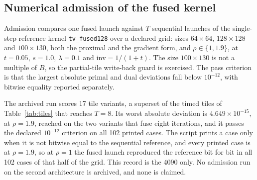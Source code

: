 \subsection{Numerical admission of the fused kernel}

Admission compares one fused launch against $T$ sequential launches of the
single-step reference kernel \texttt{tv\_fused128} over a declared grid: sizes
$64\times64$, $128\times128$ and $100\times130$, both the proximal and the
gradient form, and $\rho \in \{1, 1.9\}$, at $t=0.05$, $s=1.0$, $\lambda=0.1$
and $\text{inv}=1/(1+t)$. The size $100\times130$ is not a multiple of $B$, so
the partial-tile write-back guard is exercised. The pass criterion is that the
largest absolute primal and dual deviations fall below $10^{-12}$, with bitwise
equality reported separately.

The archived run scores 17 tile variants, a superset of the timed tiles of
Table~\ref{tab:tiles} that reaches $T=8$. Its worst absolute deviation is
$4.649\times10^{-15}$, at $\rho=1.9$, reached on the two variants that fuse
eight iterations, and it passes the declared $10^{-12}$ criterion on all 102
printed cases. The script prints a case only when it is not bitwise equal to
the sequential reference, and every printed case is at $\rho=1.9$, so at
$\rho=1$ the fused launch reproduced the reference bit for bit in all 102 cases
of that half of the grid. This record is the 4090 only.
No admission run on the second architecture is archived, and none is claimed.

